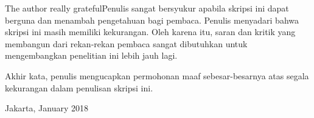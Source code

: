 The author really gratefulPenulis sangat bersyukur apabila skripsi ini dapat berguna dan menambah pengetahuan bagi pembaca. Penulis menyadari bahwa skripsi ini masih memiliki kekurangan. Oleh karena itu, saran dan kritik yang membangun dari rekan-rekan pembaca sangat dibutuhkan untuk mengembangkan penelitian ini lebih jauh lagi.

Akhir kata, penulis mengucapkan permohonan maaf sebesar-besarnya atas segala kekurangan dalam penulisan skripsi ini.

\begin{flushright}
Jakarta, January 2018
\end{flushright}